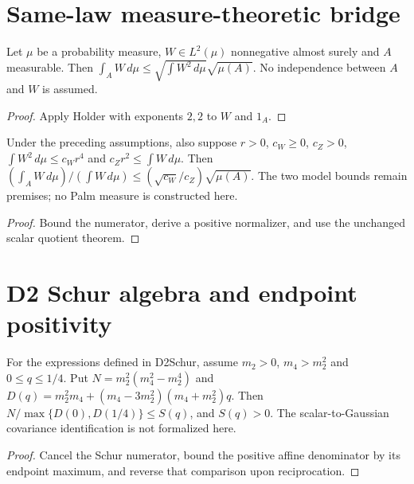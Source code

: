 \section{Same-law measure-theoretic bridge}
\begin{lemma}
\label{lem:event-cs}
Let $\mu$ be a probability measure, $W\in L^2(\mu)$ nonnegative almost
surely and $A$ measurable. Then
$\int_A W\,d\mu\le\sqrt{\int W^2\,d\mu}\sqrt{\mu(A)}$.
No independence between $A$ and $W$ is assumed.
\end{lemma}
\begin{proof}Apply Holder with exponents $2,2$ to $W$ and $1_A$.\end{proof}
\begin{lemma}
\label{lem:measure-transfer}
Under the preceding assumptions, also suppose $r>0$, $c_W\ge0$, $c_Z>0$,
$\int W^2\,d\mu\le c_Wr^4$ and $c_Zr^2\le\int W\,d\mu$.
Then $(\int_A W\,d\mu)/(\int W\,d\mu)\le(\sqrt{c_W}/c_Z)\sqrt{\mu(A)}$.
The two model bounds remain premises; no Palm measure is constructed here.
\end{lemma}
\begin{proof}Bound the numerator, derive a positive normalizer, and use
the unchanged scalar quotient theorem.\end{proof}


\section{D2 Schur algebra and endpoint positivity}
\begin{lemma}
\label{lem:d2-schur}
For the expressions defined in D2Schur, assume $m_2>0$, $m_4>m_2^2$
and $0\le q\le1/4$. Put $N=m_2^2(m_4^2-m_2^4)$ and
$D(q)=m_2^2m_4+(m_4-3m_2^2)(m_4+m_2^2)q$.
Then $N/\max\{D(0),D(1/4)\}\le S(q)$, and $S(q)>0$.
The scalar-to-Gaussian covariance identification is not formalized here.
\end{lemma}
\begin{proof}Cancel the Schur numerator, bound the positive affine denominator
by its endpoint maximum, and reverse that comparison upon reciprocation.\end{proof}
